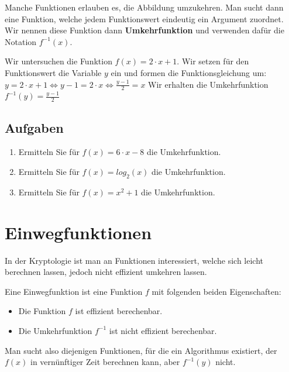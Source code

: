 Manche Funktionen erlauben es, die Abbildung umzukehren. Man sucht dann eine Funktion, welche jedem Funktionswert eindeutig ein Argument zuordnet. Wir nennen diese Funktion dann \textbf{Umkehrfunktion} und verwenden dafür die Notation $f^{-1}(x)$. 

\begin{example}
	Wir untersuchen die Funktion $f(x) = 2 \cdot x + 1$. Wir setzen für den Funktionswert die Variable $y$ ein und formen die Funktionsgleichung um: $y = 2 \cdot x + 1 \Leftrightarrow y -1 = 2 \cdot x \Leftrightarrow \frac{y-1}{2} = x$
	Wir erhalten die Umkehrfunktion $f^{-1}(y) = \frac{y-1}{2}$
\end{example}

\subsection{Aufgaben}

\begin{enumerate}
	\item Ermitteln Sie für $f(x) = 6 \cdot x - 8$ die Umkehrfunktion.
	\item Ermitteln Sie für $f(x) = log_2(x)$ die Umkehrfunktion.
	\item Ermitteln Sie für $f(x) = x^2+1$ die Umkehrfunktion.
\end{enumerate}

\section{Einwegfunktionen}

In der Kryptologie ist man an Funktionen interessiert, welche sich leicht berechnen lassen, jedoch nicht effizient umkehren lassen.

\begin{definition}
	Eine Einwegfunktion ist eine Funktion $f$ mit folgenden beiden Eigenschaften:
	\begin{itemize}
		\item Die Funktion $f$ ist effizient berechenbar.
		\item Die Umkehrfunktion $f^{-1}$ ist nicht effizient berechenbar.
	\end{itemize}
\end{definition}

Man sucht also diejenigen Funktionen, für die ein Algorithmus existiert, der $f(x)$ in vernünftiger Zeit berechnen kann, aber $f^{-1}(y)$ nicht.


